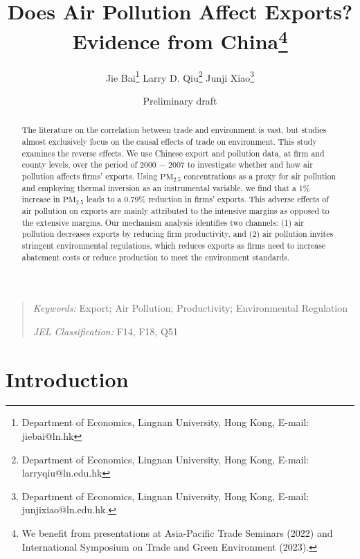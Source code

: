 \documentclass[12pt]{article}
\begin{document}
\title{Does Air Pollution Affect Exports? Evidence from China\thanks{%
We benefit from presentations at Asia-Pacific Trade Seminars (2022) and International Symposium on
Trade and Green Environment (2023).}}
\author{Jie Bai\thanks{%
Department of Economics, Lingnan University, Hong Kong, E-mail: jiebai@ln.hk}
\quad Larry D. Qiu\thanks{%
Department of Economics, Lingnan University, Hong Kong, E-mail:
larryqiu@ln.edu.hk} \quad Junji Xiao\thanks{%
Department of Economics, Lingnan University, Hong Kong, E-mail:
junjixiao@ln.edu.hk.}}
\date{Preliminary draft}

\maketitle

\begin{abstract}
The literature on the correlation between trade and environment is vast, but
studies almost exclusively focus on the causal effects of trade on
environment. This study examines the reverse effects. We use Chinese export
and pollution data, at firm and county levels, over the period of 2000 $-$ 2007
to investigate whether and how air pollution affects firms' exports. Using $%
\mathrm{PM_{2.5}}$ concentrations as a proxy for air pollution and employing
thermal inversion as an instrumental variable, we find that a 1\% increase
in $\mathrm{PM_{2.5}}$ leads to a 0.79\% reduction in firms' exports. This
adverse effects of air pollution on exports are mainly attributed to the
intensive margins as opposed to the extensive margins. Our mechanism
analysis identifies two channels: (1) air pollution decreases exports by
reducing firm productivity, and (2) air pollution invites stringent
environmental regulations, which reduces exports as firms need to increase
abatement costs or reduce production to meet the environment standards.
\end{abstract}

\begin{quote}
\emph{Keywords:} Export; Air Pollution; Productivity; Environmental 
Regulation 

\emph{JEL Classification:} F14, F18, Q51 
\end{quote}

\newpage  \setcounter{page}{1} 

\section{Introduction}
\end{document}
